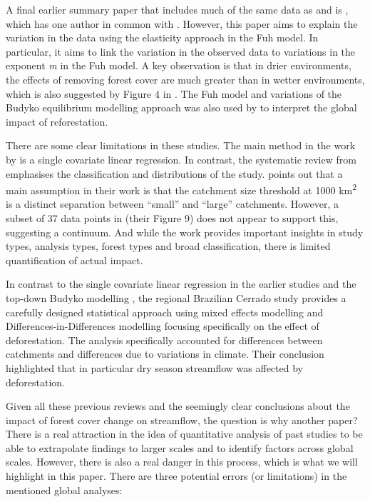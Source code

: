 \documentclass[]{elsarticle} %
\begin{document}
A final earlier summary paper that includes much of the same data as \citet{zhang2017} and \citet{filoso2017} is \citet{zhou2015}, which has one author in common with \citet{zhang2017}. However, this paper aims to explain the variation in the data using the elasticity approach in the Fuh model. In particular, it aims to link the variation in the observed data to variations in the exponent \emph{m} in the Fuh model. A key observation is that in drier environments, the effects of removing forest cover are much greater than in wetter environments, which is also suggested by Figure 4 in \citet{zhang2017}. The Fuh model and variations of the Budyko equilibrium modelling approach was also used by \citet{hoekvandijke2022} to interpret the global impact of reforestation.

There are some clear limitations in these studies. The main method in the work by \citet{zhang2017} is a single covariate linear regression. In contrast, the systematic review from \citet{filoso2017} emphasises the classification and distributions of the study. \citet{zhang2017} points out that a main assumption in their work is that the catchment size threshold at 1000 km\textsuperscript{2} is a distinct separation between ``small'' and ``large'' catchments. However, a subset of 37 data points in \citet{filoso2017} (their Figure 9) does not appear to support this, suggesting a continuum. And while the work \citet{filoso2017} provides important insights in study types, analysis types, forest types and broad classification, there is limited quantification of actual impact.

In contrast to the single covariate linear regression in the earlier studies \citep{zhang2017, filoso2017} and the top-down Budyko modelling \citep{zhou2015, hoekvandijke2022}, the regional Brazilian Cerrado study \citep{levy2018} provides a carefully designed statistical approach using mixed effects modelling and Differences-in-Differences modelling focusing specifically on the effect of deforestation. The analysis specifically accounted for differences between catchments and differences due to variations in climate. Their conclusion highlighted that in particular dry season streamflow was affected by deforestation.

Given all these previous reviews and the seemingly clear conclusions about the impact of forest cover change on streamflow, the question is why another paper?
There is a real attraction in the idea of quantitative analysis of past studies to be able to extrapolate findings to larger scales and to identify factors across global scales.
However, there is also a real danger in this process, which is what we will highlight in this paper. There are three potential errors (or limitations) in the mentioned global analyses:
\end{document}

